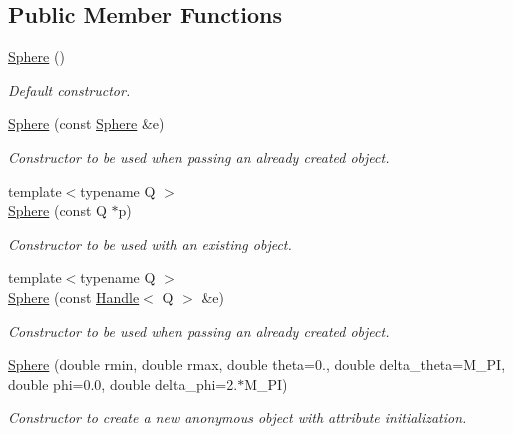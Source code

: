 \subsection*{Public Member Functions}
\begin{DoxyCompactItemize}
\item 
\hyperlink{class_d_d4hep_1_1_geometry_1_1_sphere_a4dd4b0ac58f50a79d4fdae6e296ffec7}{Sphere} ()
\begin{DoxyCompactList}\small\item\em Default constructor. \item\end{DoxyCompactList}\item 
\hyperlink{class_d_d4hep_1_1_geometry_1_1_sphere_a9f5b1f3abd0830004af5ee8748794436}{Sphere} (const \hyperlink{class_d_d4hep_1_1_geometry_1_1_sphere}{Sphere} \&e)
\begin{DoxyCompactList}\small\item\em Constructor to be used when passing an already created object. \item\end{DoxyCompactList}\item 
{\footnotesize template$<$typename Q $>$ }\\\hyperlink{class_d_d4hep_1_1_geometry_1_1_sphere_a526e8de71eeaf02a9a7324ef64805a65}{Sphere} (const Q $\ast$p)
\begin{DoxyCompactList}\small\item\em Constructor to be used with an existing object. \item\end{DoxyCompactList}\item 
{\footnotesize template$<$typename Q $>$ }\\\hyperlink{class_d_d4hep_1_1_geometry_1_1_sphere_afea9cfe454786968ac5ab3a74bf29362}{Sphere} (const \hyperlink{class_d_d4hep_1_1_handle}{Handle}$<$ Q $>$ \&e)
\begin{DoxyCompactList}\small\item\em Constructor to be used when passing an already created object. \item\end{DoxyCompactList}\item 
\hyperlink{class_d_d4hep_1_1_geometry_1_1_sphere_aaf2e06bdb209d1533dd7d2a3600f6493}{Sphere} (double rmin, double rmax, double theta=0., double delta\_\-theta=M\_\-PI, double phi=0.0, double delta\_\-phi=2.$\ast$M\_\-PI)
\begin{DoxyCompactList}\small\item\em Constructor to create a new anonymous object with attribute initialization. \item\end{DoxyCompactList}\item 

\end{DoxyCompactItemize}
